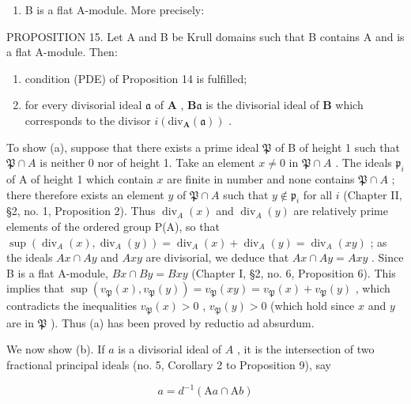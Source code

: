 \begin{enumerate}
\def\labelenumi{(\arabic{enumi})}
\setcounter{enumi}{1}
\tightlist
\item
  B is a flat A-module. More precisely:
\end{enumerate}

PROPOSITION 15. Let A and B be Krull domains such that B contains A and is a flat A-module. Then:

\begin{enumerate}
\def\labelenumi{(\alph{enumi})}
\item
  condition (PDE) of Proposition 14 is fulfilled;
\item
  for every divisorial ideal \(\mathfrak{a}\) of \(\mathbf{A}\) , \(\mathbf{B}\mathfrak{a}\) is the divisorial ideal of \(\mathbf{B}\) which corresponds to the divisor \(i(\mathrm{div}_{\mathbf{A}}(\mathfrak{a}))\) .
\end{enumerate}

To show (a), suppose that there exists a prime ideal \(\mathfrak{P}\) of B of height 1 such that \(\mathfrak{P} \cap A\) is neither 0 nor of height 1. Take an element \(x \neq 0\) in \(\mathfrak{P} \cap A\) . The ideals \(\mathfrak{p}_i\) of A of height 1 which contain \(x\) are finite in number and none contains \(\mathfrak{P} \cap A\) ; there therefore exists an element \(y\) of \(\mathfrak{P} \cap A\) such that \(y \notin \mathfrak{p}_i\) for all \(i\) (Chapter II, §2, no. 1, Proposition 2). Thus \(\operatorname{div}_{A}(x)\) and \(\operatorname{div}_{A}(y)\) are relatively prime elements of the ordered group P(A), so that \(\sup (\operatorname{div}_{A}(x), \operatorname{div}_{A}(y)) = \operatorname{div}_{A}(x) + \operatorname{div}_{A}(y) = \operatorname{div}_{A}(xy)\) ; as the ideals \(Ax \cap Ay\) and \(Axy\) are divisorial, we deduce that \(Ax \cap Ay = Axy\) . Since B is a flat A-module, \(Bx \cap By = Bxy\) (Chapter I, §2, no. 6, Proposition 6). This implies that \(\sup (v_{\mathfrak{P}}(x), v_{\mathfrak{P}}(y)) = v_{\mathfrak{P}}(xy) = v_{\mathfrak{P}}(x) + v_{\mathfrak{P}}(y)\) , which contradicts the inequalities \(v_{\mathfrak{P}}(x) > 0\) , \(v_{\mathfrak{P}}(y) > 0\) (which hold since \(x\) and \(y\) are in \(\mathfrak{P}\) ). Thus (a) has been proved by reductio ad absurdum.

We now show (b). If \(a\) is a divisorial ideal of \(A\) , it is the intersection of two fractional principal ideals (no. 5, Corollary 2 to Proposition 9), say

\[
a = d ^ {- 1} (\mathrm{A} a \cap \mathrm{A} b)
\]


